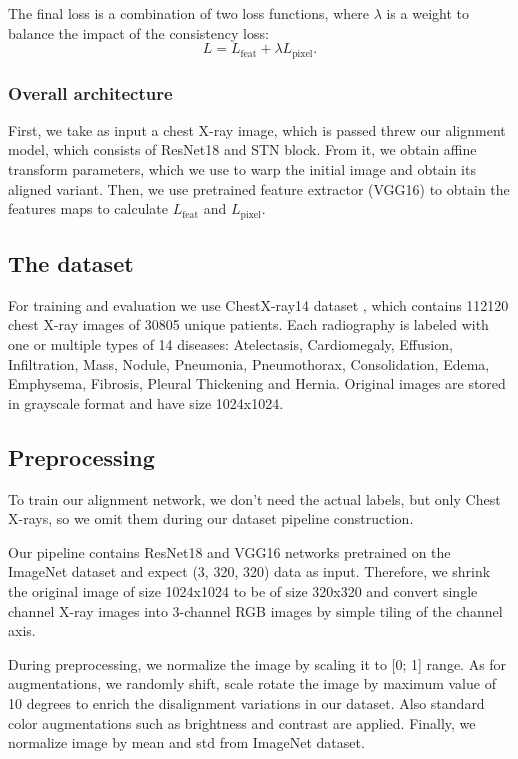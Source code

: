 \documentclass{article}
\begin{document}
The final loss is a combination of two loss functions, where $ \lambda $ is a weight 
 to balance the impact of the consistency loss:
\begin{equation}
    L = L_{\text{feat}} + \lambda L_{\text{pixel}}.
\end{equation}


\subsubsection{Overall architecture}

First, we take as input a chest X-ray image, which is passed threw our alignment 
model, which consists of ResNet18 and STN block. From it, we obtain affine transform 
parameters, which we use to warp the initial image and obtain its aligned variant. 
Then, we use pretrained feature extractor (VGG16) to obtain the features maps to 
calculate $L_{\text{feat}}$ and $ L_{\text{pixel}} $.


\subsection{The dataset}
For training and evaluation we use ChestX-ray14 dataset \cite{DataSet}, which 
contains 112120 chest X-ray images of 30805 unique patients. Each radiography 
is labeled with one or multiple types of 14 diseases: Atelectasis, 
Cardiomegaly, Effusion, Infiltration, Mass, Nodule, Pneumonia, Pneumothorax, 
Consolidation, Edema, Emphysema, Fibrosis, Pleural Thickening and Hernia. 
Original images are stored in grayscale format and have size 1024x1024. 

\subsection{Preprocessing}
To train our alignment network, we don't need the actual labels, but only Chest 
X-rays, so we omit them during our dataset pipeline construction.

Our pipeline contains ResNet18 and VGG16 networks pretrained on the ImageNet 
dataset \cite{ImageNet} and expect (3, 320, 320) data as input. Therefore, we 
shrink the original image of size 1024x1024 to be of size 320x320 and convert 
single channel X-ray images into 3-channel RGB images by simple tiling of the 
channel axis.

During preprocessing, we normalize the image by scaling it to [0; 1] range. As 
for augmentations, we randomly shift, scale rotate the image by maximum value 
of 10 degrees to enrich the disalignment variations in our dataset. Also 
standard color augmentations such as brightness and contrast are applied. 
Finally, we normalize image by mean and std from ImageNet dataset.
\end{document}
